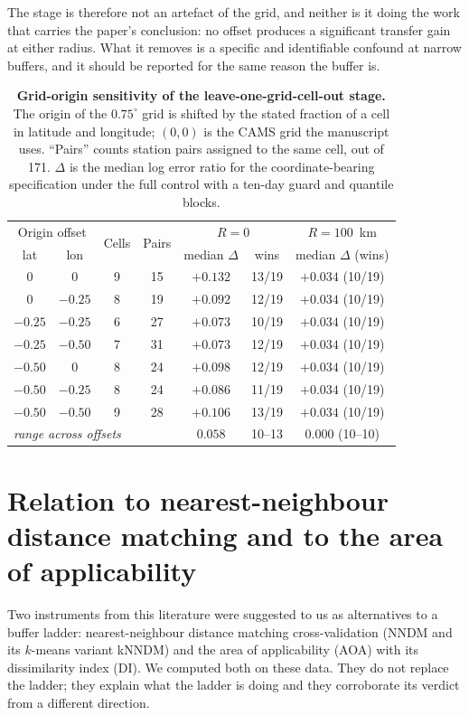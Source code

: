 \documentclass[11pt]{article}
\begin{document}
The stage is therefore not an artefact of the grid, and neither is it doing the work that
carries the paper's conclusion: no offset produces a significant transfer gain at either
radius. What it removes is a specific and identifiable confound at narrow buffers, and it
should be reported for the same reason the buffer is.

\begin{table}[htbp]\centering\footnotesize
\caption{\textbf{Grid-origin sensitivity of the leave-one-grid-cell-out stage.} The origin of the $0.75^\circ$ grid is shifted by the stated fraction of a cell in latitude and longitude; $(0,0)$ is the CAMS grid the manuscript uses. ``Pairs'' counts station pairs assigned to the same cell, out of 171. $\Delta$ is the median log error ratio for the coordinate-bearing specification under the full control with a ten-day guard and quantile blocks.}
\begin{tabular}{ccccccc}\toprule
\multicolumn{2}{c}{Origin offset} & \multirow{2}{*}{Cells} & \multirow{2}{*}{Pairs} & \multicolumn{2}{c}{$R=0$} & $R=100$~km \\
lat & lon & & & median $\Delta$ & wins & median $\Delta$ (wins) \\ \midrule
$0$ & $0$ & 9 & 15 & $+0.132$ & 13/19 & $+0.034$ (10/19) \\
$0$ & $-0.25$ & 8 & 19 & $+0.092$ & 12/19 & $+0.034$ (10/19) \\
$-0.25$ & $-0.25$ & 6 & 27 & $+0.073$ & 10/19 & $+0.034$ (10/19) \\
$-0.25$ & $-0.50$ & 7 & 31 & $+0.073$ & 12/19 & $+0.034$ (10/19) \\
$-0.50$ & $0$ & 8 & 24 & $+0.098$ & 12/19 & $+0.034$ (10/19) \\
$-0.50$ & $-0.25$ & 8 & 24 & $+0.086$ & 11/19 & $+0.034$ (10/19) \\
$-0.50$ & $-0.50$ & 9 & 28 & $+0.106$ & 13/19 & $+0.034$ (10/19) \\ \midrule
\multicolumn{4}{l}{\textit{range across offsets}} & $0.058$ & 10--13 & $0.000$ (10--10) \\
\bottomrule\end{tabular}\end{table}

\section{Relation to nearest-neighbour distance matching and to the area of applicability}
Two instruments from this literature were suggested to us as alternatives to a buffer
ladder: nearest-neighbour distance matching cross-validation (NNDM and its $k$-means
variant kNNDM) and the area of applicability (AOA) with its dissimilarity index (DI). We
computed both on these data. They do not replace the ladder; they explain what the ladder
is doing and they corroborate its verdict from a different direction.
\end{document}
